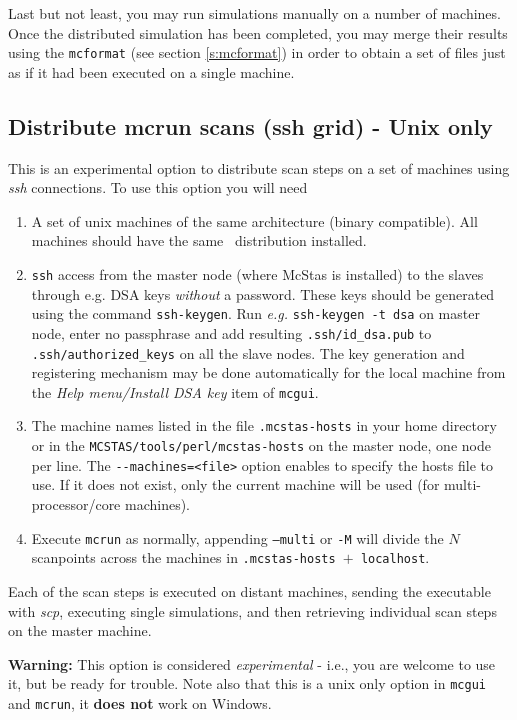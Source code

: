 Last but not least, you may run simulations manually on a number of machines.
Once the distributed simulation has been completed, you may merge their results using the \verb+mcformat+ (see section \ref{s:mcformat})  in order to obtain a set of files just as if it had been executed on a single machine.

\subsection{Distribute mcrun scans (ssh grid) - Unix only}\label{s:ssh-grid}
  This is an experimental option to
  distribute scan steps on a set of machines using \emph{ssh}
  connections. To use this option you will need
  \begin{enumerate}
  \item{A set of unix machines of the same architecture (binary compatible). All
      machines should have the same \MCS\ distribution installed.}
  \item{ \texttt{ssh} access from the master node (where McStas is
      installed) to the slaves through e.g. DSA keys \emph{without} a
      password. These keys should be generated using the command
      \texttt{ssh-keygen}. Run \emph{e.g.} \texttt{ssh-keygen -t dsa} on
      master node, enter no passphrase and add resulting
      \texttt{.ssh/id\_dsa.pub} to \texttt{.ssh/authorized\_keys}
      on all the slave nodes. The key generation and registering mechanism may be done automatically for the local machine from the \emph{Help menu/Install DSA key} item of \verb+mcgui+.}
  \item{The machine names listed in the file \texttt{.mcstas-hosts} in
      your home directory or in the \texttt{MCSTAS/tools/perl/mcstas-hosts} on
      the master node, one node per line. The \verb'--machines=<file>' option
      enables to specify the hosts file to use. If it does not exist, only the current machine will be used (for multi-processor/core machines).}
  \item{Execute \texttt{mcrun} as normally, appending \texttt{--multi} or
      \texttt{-M} will divide the $N$ scanpoints across the machines in
      \texttt{.mcstas-hosts $+$ localhost}.}
  \end{enumerate}
  Each of the scan steps is executed on distant machines, sending the executable
  with \emph{scp}, executing single simulations, and then retrieving individual
  scan steps on the master machine.

  {\bf Warning:} This option is considered \emph{experimental} - i.e.,
  you are welcome to use it, but be ready for trouble. Note also that
  this is a unix only option in \texttt{mcgui} and \texttt{mcrun}, it
  {\bf does not} work on Windows.

